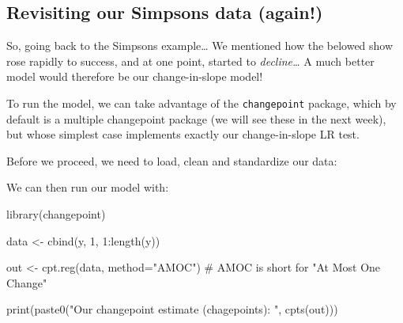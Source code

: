 \documentclass[
  letterpaper,
  DIV=11,
  numbers=noendperiod]{scrreprt}
\newenvironment{Shaded}{\begin{snugshade}}{\end{snugshade}}
\newcommand{\AttributeTok}[1]{\textcolor[rgb]{0.40,0.45,0.13}{#1}}
\newcommand{\CommentTok}[1]{\textcolor[rgb]{0.37,0.37,0.37}{#1}}
\newcommand{\DecValTok}[1]{\textcolor[rgb]{0.68,0.00,0.00}{#1}}
\newcommand{\FunctionTok}[1]{\textcolor[rgb]{0.28,0.35,0.67}{#1}}
\newcommand{\NormalTok}[1]{\textcolor[rgb]{0.00,0.23,0.31}{#1}}
\newcommand{\OtherTok}[1]{\textcolor[rgb]{0.00,0.23,0.31}{#1}}
\newcommand{\SpecialCharTok}[1]{\textcolor[rgb]{0.37,0.37,0.37}{#1}}
\newcommand{\StringTok}[1]{\textcolor[rgb]{0.13,0.47,0.30}{#1}}
\begin{document}
\subsection{Revisiting our Simpsons data
(again!)}\label{revisiting-our-simpsons-data-again}

So, going back to the Simpsons example\ldots{} We mentioned how the
belowed show rose rapidly to success, and at one point, started to
\emph{decline\ldots{}} A much better model would therefore be our
change-in-slope model!

To run the model, we can take advantage of the \texttt{changepoint}
package, which by default is a multiple changepoint package (we will see
these in the next week), but whose simplest case implements exactly our
change-in-slope LR test.

Before we proceed, we need to load, clean and standardize our data:

\begin{Shaded}
\end{Shaded}

We can then run our model with:

\begin{Shaded}
\begin{Highlighting}[]
\FunctionTok{library}\NormalTok{(changepoint)}

\NormalTok{data }\OtherTok{\textless{}{-}} \FunctionTok{cbind}\NormalTok{(y, }\DecValTok{1}\NormalTok{, }\DecValTok{1}\SpecialCharTok{:}\FunctionTok{length}\NormalTok{(y))}

\NormalTok{out }\OtherTok{\textless{}{-}} \FunctionTok{cpt.reg}\NormalTok{(data, }\AttributeTok{method=}\StringTok{"AMOC"}\NormalTok{) }\CommentTok{\# AMOC is short for "At Most One Change"}

\FunctionTok{print}\NormalTok{(}\FunctionTok{paste0}\NormalTok{(}\StringTok{"Our changepoint estimate (chagepoints): "}\NormalTok{,  }\FunctionTok{cpts}\NormalTok{(out)))}
\end{Highlighting}
\end{Shaded}
\end{document}

